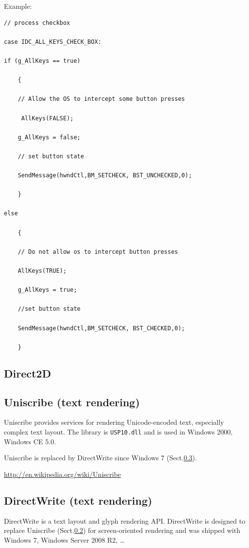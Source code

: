 Example:
\begin{verbatim}
// process checkbox

case IDC_ALL_KEYS_CHECK_BOX:

if (g_AllKeys == true)

    {

    // Allow the OS to intercept some button presses

     AllKeys(FALSE);

    g_AllKeys = false;

    // set button state

    SendMessage(hwndCtl,BM_SETCHECK, BST_UNCHECKED,0);

    }

else

    {

    // Do not allow os to intercept button presses

    AllKeys(TRUE);

    g_AllKeys = true;

    //set button state

    SendMessage(hwndCtl,BM_SETCHECK, BST_CHECKED,0);

    }
\end{verbatim}

\subsection{Direct2D}
\label{sec:Direct2D}


\subsection{Uniscribe (text rendering)}
\label{sec:Uniscribe}

Uniscribe provides services for rendering Unicode-encoded text, especially
complex text layout. The library is \verb!USP10.dll! and is used in Windows
2000, Windows CE 5.0.

Uniscribe is replaced by DirectWrite since Windows 7
(Sect.\ref{sec:DirectWrite}).

\url{http://en.wikipedia.org/wiki/Uniscribe}

\subsection{DirectWrite (text rendering)}
\label{sec:DirectWrite}

DirectWrite is a text layout and glyph rendering API.
DirectWrite is designed to replace Uniscribe (Sect.\ref{sec:Uniscribe}) for
screen-oriented rendering and was shipped with Windows 7, Windows Server 2008 R2, \ldots

